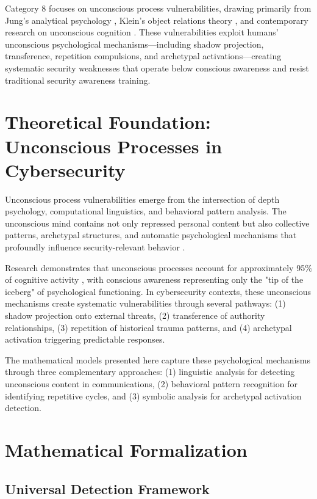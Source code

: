 \documentclass[11pt,a4paper]{article}
\begin{document}
Category 8 focuses on unconscious process vulnerabilities, drawing primarily from Jung's analytical psychology \cite{jung1969}, Klein's object relations theory \cite{klein1946}, and contemporary research on unconscious cognition \cite{bargh1997}. These vulnerabilities exploit humans' unconscious psychological mechanisms—including shadow projection, transference, repetition compulsions, and archetypal activations—creating systematic security weaknesses that operate below conscious awareness and resist traditional security awareness training.

\section{Theoretical Foundation: Unconscious Processes in Cybersecurity}

Unconscious process vulnerabilities emerge from the intersection of depth psychology, computational linguistics, and behavioral pattern analysis. The unconscious mind contains not only repressed personal content but also collective patterns, archetypal structures, and automatic psychological mechanisms that profoundly influence security-relevant behavior \cite{jung1969}.

Research demonstrates that unconscious processes account for approximately 95\% of cognitive activity \cite{bargh1997}, with conscious awareness representing only the "tip of the iceberg" of psychological functioning. In cybersecurity contexts, these unconscious mechanisms create systematic vulnerabilities through several pathways: (1) shadow projection onto external threats, (2) transference of authority relationships, (3) repetition of historical trauma patterns, and (4) archetypal activation triggering predictable responses.

The mathematical models presented here capture these psychological mechanisms through three complementary approaches: (1) linguistic analysis for detecting unconscious content in communications, (2) behavioral pattern recognition for identifying repetitive cycles, and (3) symbolic analysis for archetypal activation detection.

\section{Mathematical Formalization}

\subsection{Universal Detection Framework}
\end{document}

